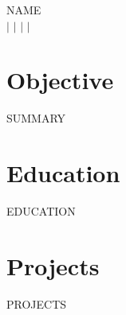 \documentclass[10pt,letterpaper]{article}
\makeatletter
\newcommand{\eduentry}[4]{%
  \vspace{2pt}%
  \begin{tabular*}{\textwidth}[t]{l@{\extracolsep{\fill}}r}%
    \textbf{#1} & \textit{#4} \\%
    \textit{\small #2} & {\small #3} \\%
  \end{tabular*}\par\nopagebreak\vspace{-3pt}%
}
\newcommand{\projentry}[3]{%
  \vspace{2pt}%
  \begin{tabular*}{\textwidth}[t]{l@{\extracolsep{\fill}}r}%
    \textbf{#1}\enspace---\enspace\textit{#2} & #3 \\%
  \end{tabular*}\par\nopagebreak\vspace{-3pt}%
}
\makeatother
\begin{document}
\begin{center}
  {\Huge\scshape {{NAME}}}\\[3pt]
  \small
   $|$
  \href{mailto:{{EMAIL}}}{} $|$
  \href{https://linkedin.com/in/{{LINKEDIN}}}{} $|$
  \href{https://github.com/{{GITHUB}}}{} $|$
\end{center}

\vspace{3pt}

\section{Objective}
{{SUMMARY}}

\section{Education}
{{EDUCATION}}

\section{Projects}
{{PROJECTS}}

\end{document}
